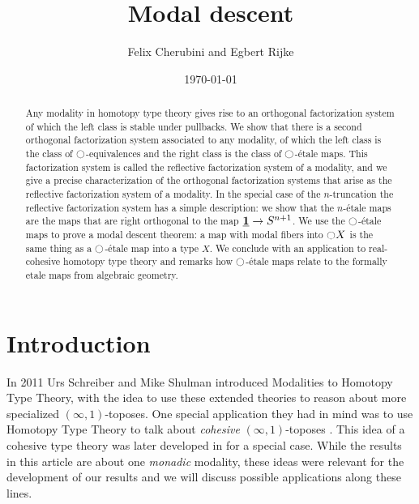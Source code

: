 \documentclass[9pt,twosided]{amsart}
\title{Modal descent}
\author{Felix Cherubini and Egbert Rijke}
\date{\today}
\begin{document}
\maketitle

\begin{abstract}
  Any modality in homotopy type theory gives rise to an orthogonal factorization system of which the left class is stable under pullbacks. We show that there is a second orthogonal factorization system associated to any modality, of which the left class is the class of ${\ocircle}$-equivalences and the right class is the class of ${\ocircle}$-\'etale maps. This factorization system is called the reflective factorization system of a modality, and we give a precise characterization of the orthogonal factorization systems that arise as the reflective factorization system of a modality. In the special case of the $n$-truncation the reflective factorization system has a simple description: we show that the $n$-\'etale maps are the maps that are right orthogonal to the map $\underline{\mathbf{1}} \to S^{n+1}$. We use the ${\ocircle}$-\'etale maps to prove a modal descent theorem: a map with modal fibers into ${\ocircle} X$ is the same thing as a ${\ocircle}$-\'etale map into a type $X$. We conclude with an application to real-cohesive homotopy type theory and remarks how ${\ocircle}$-étale maps relate to the formally etale maps from algebraic geometry. 
\end{abstract}

\section{Introduction}
In 2011 Urs Schreiber and Mike Shulman introduced Modalities to Homotopy Type Theory,
with the idea to use these extended theories to reason about more specialized $(\infty,1)$-toposes.
One special application they had in mind was to use Homotopy Type Theory to talk about \emph{cohesive} $(\infty,1)$-toposes \cite{ShulmanSchreiber}.
This idea of a cohesive type theory was later developed in \cite{ShulmanRealCohesion} for a special case.
While the results in this article are about one \emph{monadic} modality,
these ideas were relevant for the development of our results and we will discuss possible applications along these lines.
  
\end{document}
